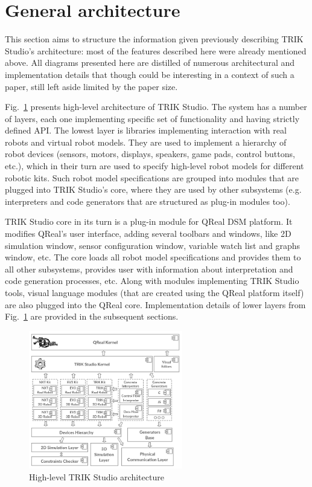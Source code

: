 \documentclass[conference]{IEEEtran}
\begin{document}
\section{General architecture}
\label{chapter:commonArchitecture}

This section aims to structure the information given previously describing TRIK Studio's architecture: most of the features described here were already mentioned above. All diagrams presented here are distilled of numerous architectural and implementation details that though could be interesting in a context of such a paper, still left aside limited by the paper size.

Fig.~\ref{image:commonTSArch} presents high-level architecture of TRIK Studio. The system has a number of layers, each one implementing specific set of functionality and having strictly defined API. The lowest layer is libraries implementing interaction with real robots and virtual robot models. They are used to implement a hierarchy of robot devices (sensors, motors, displays, speakers, game pads, control buttons, etc.), which in their turn are used to specify high-level robot models for different robotic kits. Such robot model specifications are grouped into modules that are plugged into TRIK Studio's core, where they are used by other subsystems (e.g. interpreters and code generators that are structured as plug-in modules too).

TRIK Studio core in its turn is a plug-in module for QReal DSM platform. It modifies QReal's user interface, adding several toolbars and windows, like 2D simulation window, sensor configuration window, variable watch list and graphs window, etc. The core loads all robot model specifications and provides them to all other subsystems, provides user with information about interpretation and code generation processes, etc. Along with modules implementing TRIK Studio tools, visual language modules (that are created using the QReal platform itself) are also plugged into the QReal core. Implementation details of lower layers from Fig.~\ref{image:commonTSArch} are provided in the subsequent sections.

\begin{figure}[ht]
    \centering
    \includegraphics[width=0.6\textwidth]{TS_Common_Architecture.png}
    \caption{High-level TRIK Studio architecture}
    \label{image:commonTSArch}
\end{figure}
\end{document}
